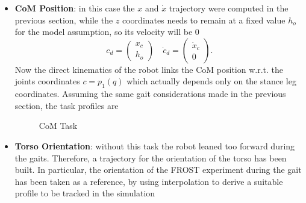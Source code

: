 \documentclass[11pt]{article}
\begin{document}
\begin{itemize}
\item \textbf{CoM Position}: in this case the $x$ and $\dot{x}$ trajectory were computed in the previous section, while the $z$ coordinates needs to remain at a fixed value $h_o$ for the model assumption, so its velocity will be 0
\begin{equation}
\label{eqn:com_task}
c_d = \begin{pmatrix}
x_c \\
h_o
\end{pmatrix} \quad \dot{c}_d = \begin{pmatrix}
\dot{x}_c \\
0
\end{pmatrix}.
\end{equation}
Now the direct kinematics of the robot links the CoM position w.r.t. the joints coordinates $c=p_1(q)$ which actually depends only on the stance leg coordinates. Assuming the same gait considerations made in the previous section, the task profiles are
\begin{figure}[H]
\centering
{}
\caption{CoM Task}
\end{figure}
\item \textbf{Torso Orientation}: without this task the robot leaned too forward during the gaits. Therefore, a trajectory for the orientation of the torso has been built. In particular, the orientation of the FROST experiment during the gait has been taken as a reference, by using interpolation to derive a suitable profile to be tracked in the simulation

\end{itemize}
\end{document}

